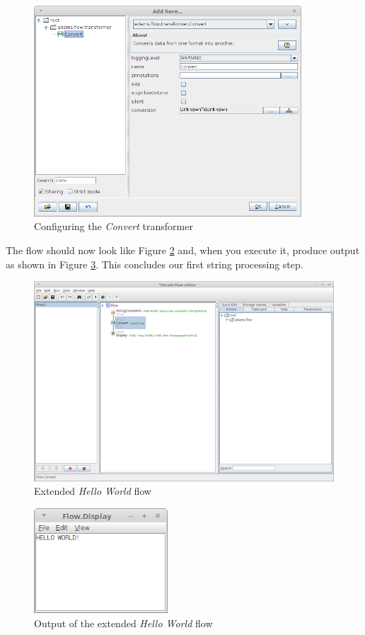 \begin{figure}[htb]
  \centering
  \includegraphics[width=10.0cm]{images/floweditor-helloworld-processdata3.png}
  \caption{Configuring the \textit{Convert} transformer}
  \label{floweditor-helloworld-processdata3}
\end{figure}

The flow should now look like Figure \ref{floweditor-helloworld-processdata4}
and, when you execute it, produce output as shown in Figure
\ref{floweditor-helloworld-processdata5}. This concludes our first
string processing step.

\begin{figure}[htb]
  \centering
  \includegraphics[width=12.0cm]{images/floweditor-helloworld-processdata4.png}
  \caption{Extended \textit{Hello World} flow}
  \label{floweditor-helloworld-processdata4}
\end{figure}

\begin{figure}[htb]
  \centering
  \includegraphics[width=5.0cm]{images/floweditor-helloworld-processdata5.png}
  \caption{Output of the extended \textit{Hello World} flow}
  \label{floweditor-helloworld-processdata5}
\end{figure}

